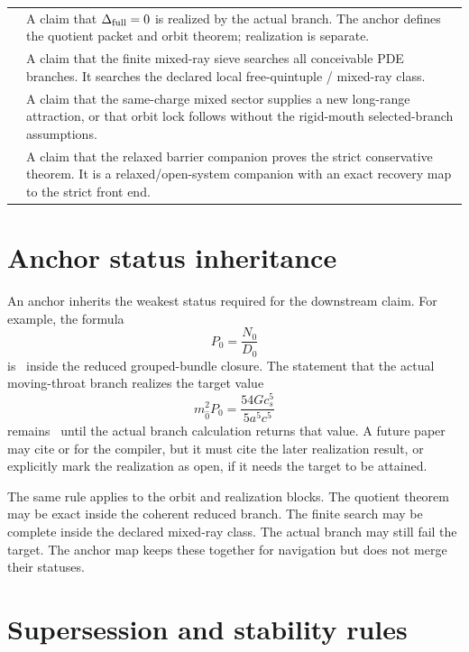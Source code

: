 \begin{longtable}{L{0.16\textwidth}L{0.74\textwidth}}
\addlinespace
{} & A claim that \(\Delta_{\rm full}=0\) is realized by the actual branch.  The anchor defines the quotient packet and orbit theorem; realization is separate. \\
\addlinespace
{} & A claim that the finite mixed-ray sieve searches all conceivable PDE branches.  It searches the declared local free-quintuple / mixed-ray class. \\
\addlinespace
{} & A claim that the same-charge mixed sector supplies a new long-range attraction, or that orbit lock follows without the rigid-mouth selected-branch assumptions. \\
\addlinespace
{} & A claim that the relaxed barrier companion proves the strict conservative theorem.  It is a relaxed/open-system companion with an exact recovery map to the strict front end. \\
\bottomrule
\end{longtable}

\section{Anchor status inheritance}
\label{sec:anchor-status-inheritance}

An anchor inherits the weakest status required for the downstream claim.  For example, the formula
\[
  P_0=\frac{N_0}{D_0}
\]
is \StatusExactClosure\ inside the reduced grouped-bundle closure.  The statement that the actual moving-throat branch realizes the target value
\[
  m_{\hat 0}^{2}P_0=\frac{54Gc_s^5}{5a^5c^5}
\]
remains \StatusOpen\ until the actual branch calculation returns that value.  A future paper may cite  or  for the compiler, but it must cite the later realization result, or explicitly mark the realization as open, if it needs the target to be attained.

The same rule applies to the orbit and realization blocks.  The quotient theorem may be exact inside the coherent reduced branch.  The finite search may be complete inside the declared mixed-ray class.  The actual branch may still fail the target.  The anchor map keeps these together for navigation but does not merge their statuses.

\section{Supersession and stability rules}
\label{sec:anchor-supersession-rules}

